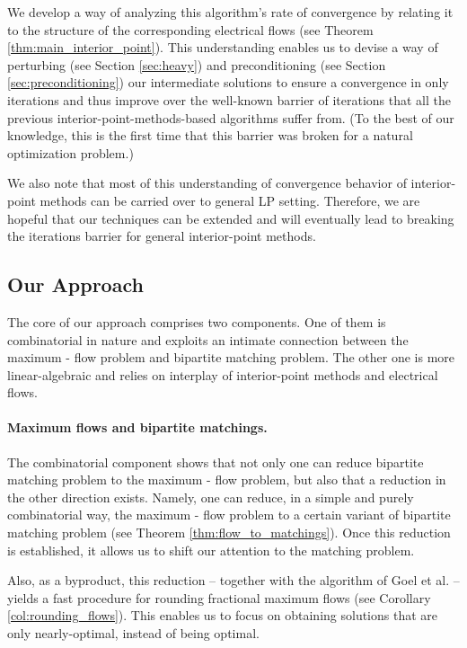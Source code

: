 \documentclass[11pt, letterpaper]{article}
\begin{document}
We develop a way of analyzing this algorithm's rate of convergence by relating it to the structure of the corresponding electrical flows (see Theorem \ref{thm:main_interior_point}). This understanding enables us to devise a way of perturbing (see Section \ref{sec:heavy}) and preconditioning (see Section \ref{sec:preconditioning}) our intermediate solutions to ensure a convergence in only  iterations and thus improve over the well-known barrier of  iterations that all the previous interior-point-methods-based algorithms suffer from. (To the best of our knowledge, this is the first time that this barrier was broken for a natural optimization problem.) 

We also note that most of this understanding of convergence behavior of interior-point methods can be carried over to general LP setting. Therefore, we are hopeful that our techniques can be extended and will eventually lead to breaking the  iterations barrier for general interior-point methods.

\subsection{Our Approach}

The core of our approach comprises two components. One of them is combinatorial in nature and exploits an intimate connection between the maximum - flow problem and  bipartite matching problem. The other one is more linear-algebraic and relies on interplay of interior-point methods and electrical flows. 

\paragraph{Maximum flows and bipartite matchings.} The combinatorial component shows that not only one can reduce bipartite matching problem to the maximum - flow problem, but also that a reduction in the other direction exists. Namely, one can reduce, in a simple and purely combinatorial way, the maximum - flow problem to a certain variant of bipartite matching problem (see Theorem \ref{thm:flow_to_matchings}). Once this reduction is established, it allows us to shift our attention to the matching problem. 

Also, as a byproduct, this reduction -- together with the algorithm of Goel et al. \cite{GoelKK10} -- yields a fast procedure for rounding fractional maximum flows (see Corollary \ref{col:rounding_flows}). This enables us to focus on obtaining solutions that are only nearly-optimal, instead of being optimal.
\end{document}
